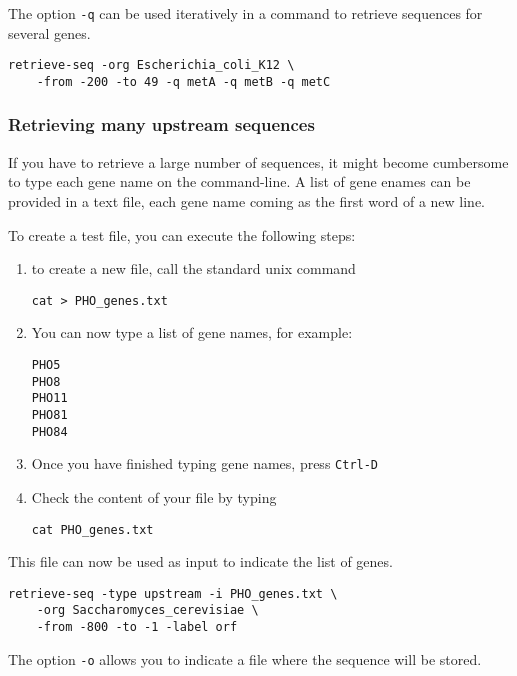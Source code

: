 The option \texttt{-q} can be used iteratively in a command to
retrieve sequences for several genes.

\begin{verbatim}
retrieve-seq -org Escherichia_coli_K12 \
    -from -200 -to 49 -q metA -q metB -q metC
\end{verbatim}

\subsubsection{Retrieving many upstream sequences}

If you have to retrieve a large number of sequences, it might become
cumbersome to type each gene name on the command-line. A list of gene
enames can be provided in a text file, each gene name coming as the
first word of a new line.

To create a test file, you can execute the following steps:
\begin{enumerate}
\item to create a new file, call the standard unix command 

\begin{verbatim}
cat > PHO_genes.txt
\end{verbatim} 

\item You can now type a list of gene names, for example:

\begin{verbatim}
PHO5
PHO8
PHO11
PHO81
PHO84
\end{verbatim} 

\item Once you have finished typing gene names, press \texttt{Ctrl-D}

\item Check the content of your file by typing 

\begin{verbatim}
cat PHO_genes.txt
\end{verbatim} 

\end{enumerate}


This file can now be used as input to indicate the list of genes.

\begin{verbatim}
retrieve-seq -type upstream -i PHO_genes.txt \
    -org Saccharomyces_cerevisiae \
    -from -800 -to -1 -label orf
\end{verbatim} 

The option \texttt{-o} allows you to indicate a file where the
sequence will be stored.

